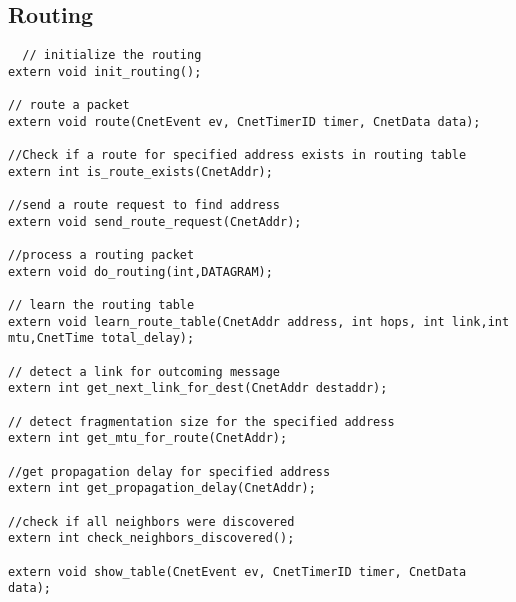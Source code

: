 \documentclass{article}
\begin{document}
\subsection{Routing}

  \begin{lstlisting} 
  // initialize the routing
extern void init_routing();

// route a packet
extern void route(CnetEvent ev, CnetTimerID timer, CnetData data);

//Check if a route for specified address exists in routing table
extern int is_route_exists(CnetAddr);

//send a route request to find address
extern void send_route_request(CnetAddr);

//process a routing packet
extern void do_routing(int,DATAGRAM);

// learn the routing table
extern void learn_route_table(CnetAddr address, int hops, int link,int mtu,CnetTime total_delay);

// detect a link for outcoming message
extern int get_next_link_for_dest(CnetAddr destaddr);

// detect fragmentation size for the specified address
extern int get_mtu_for_route(CnetAddr);

//get propagation delay for specified address
extern int get_propagation_delay(CnetAddr);

//check if all neighbors were discovered
extern int check_neighbors_discovered();

extern void show_table(CnetEvent ev, CnetTimerID timer, CnetData data);
  \end{lstlisting}
\end{document}

